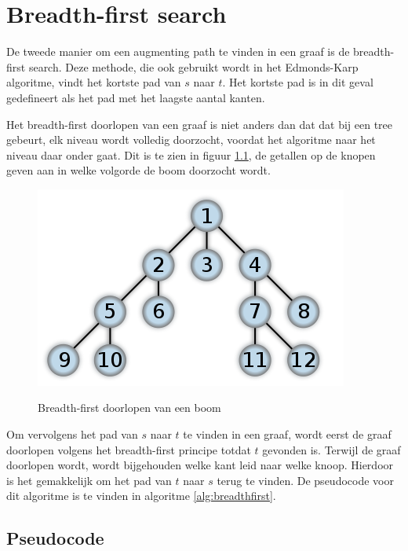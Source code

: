 \chapter{Breadth-first search}
\label{chap:breadthfirst}

De tweede manier om een augmenting path te vinden in een graaf is de breadth-first search. Deze methode, die ook gebruikt wordt in het Edmonds-Karp algoritme, vindt het kortste pad van $s$ naar $t$. Het kortste pad is in dit geval gedefineert als het pad met het laagste aantal kanten.

Het breadth-first doorlopen van een graaf is niet anders dan dat dat bij een tree gebeurt, elk niveau wordt volledig doorzocht, voordat het algoritme naar het niveau daar onder gaat. Dit is te zien in figuur \ref{fig:breadthFirstTree}, de getallen op de knopen geven aan in welke volgorde de boom doorzocht wordt.

\begin{figure}[h]
 \centering
 \includegraphics[width=0.5\linewidth]{breadthfirst/breadthfirsttree}
 \label{fig:breadthFirstTree}
 \caption{Breadth-first doorlopen van een boom}
\end{figure}

Om vervolgens het pad van $s$ naar $t$ te vinden in een graaf, wordt eerst de graaf doorlopen volgens het breadth-first principe totdat $t$ gevonden is. Terwijl de graaf doorlopen wordt, wordt bijgehouden welke kant leid naar welke knoop. Hierdoor is het gemakkelijk om het pad van $t$ naar $s$ terug te vinden. De pseudocode voor dit algoritme is te vinden in algoritme \ref{alg:breadthfirst}.

\section{Pseudocode}

